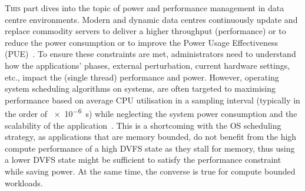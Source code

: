 
\lettrine{T}{his} part dives into the topic of power and performance management in data
centre environments. Modern and dynamic data centres continuously update and replace
commodity servers to deliver a higher throughput (performance) or to reduce the power
consumption or to improve the Power Usage Effectiveness (PUE)~\citep{4544393, Google:PUE}.
To ensure these constraints are met, administrators need to understand how the
applications' phases, external perturbation, current hardware settings, etc., impact the
(single thread) performance and power. However, operating system scheduling algorithms on
\muc systems, are often targeted to maximising performance based on average CPU
utilisation in a sampling interval (typically in the order of \SI{e-6}{\second}) while
neglecting the system power consumption and the scalability of the
application~\citep{ondemand}. This is a shortcoming with the OS scheduling strategy, as
applications that are memory bounded, do not benefit from the high compute performance of
a high DVFS state as they stall for memory, thus using a lower DVFS state might be
sufficient to satisfy the performance constraint while saving power.  At the same time,
the converse is true for compute bounded workloads.   


